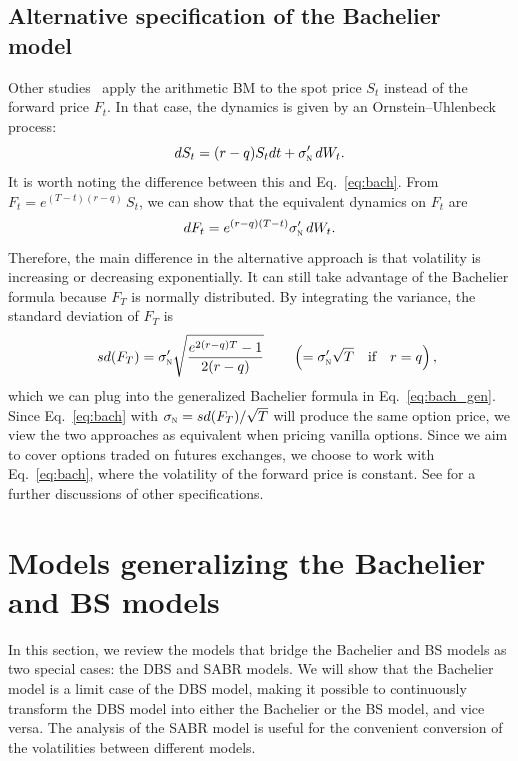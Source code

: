 \documentclass[a4paper,review]{elsarticle}
\newcommand{\qtext}[2][\quad]{#1\text{#2}#1}
\newcommand{\sigman}{\sigma_\textsc{n}}
\begin{document}
\subsection{Alternative specification of the Bachelier model} \noindent
Other studies~\citep{brooks2017arithmetic} apply the arithmetic BM to the spot price $S_t$ instead of the forward price $F_t$. In that case, the dynamics is given by an Ornstein--Uhlenbeck process:
$$ dS_t = (r-q) S_t dt + \sigman' \, dW_t. $$
It is worth noting the difference between this and Eq.~\eqref{eq:bach}. From $F_t = e^{(T-t)(r-q)}\,S_t$, we can show that the equivalent dynamics on $F_t$ are 
$$ dF_t = e^{(r-q)(T-t)} \sigman' \, dW_t.$$
Therefore, the main difference in the alternative approach is that volatility is increasing or decreasing exponentially. It can still take advantage of the Bachelier formula because $F_T$ is normally distributed. By integrating the variance, the standard deviation of $F_T$ is
$$ \quad sd(F_T) = \sigman' \sqrt{\frac{e^{2(r-q)T} - 1}{2(r-q)}} \qquad \left( = \sigman'\sqrt{T} \qtext{if} r=q \right),
$$
which we can plug into the generalized Bachelier formula in Eq.~\eqref{eq:bach_gen}. Since Eq.~\eqref{eq:bach} with $\sigman = sd(F_T)/\sqrt{T}$ will produce the same option price, we view the two approaches as equivalent when pricing vanilla options.
Since we aim to cover options traded on futures exchanges, we choose to work with Eq.~\eqref{eq:bach}, where the volatility of the forward price is constant. See \citet{takehara2010new} for a further discussions of other specifications.

\section{Models generalizing the Bachelier and BS models}\label{sec:related_models} \noindent
In this section, we review the models that bridge the Bachelier and BS models as two special cases: 
the DBS and SABR models. We will show that the Bachelier model is a limit case of the DBS model, making it possible to continuously transform the DBS model into either the Bachelier or the BS model, and vice versa. The analysis of the SABR model is useful for the convenient conversion of the volatilities between different models. 
\end{document}

